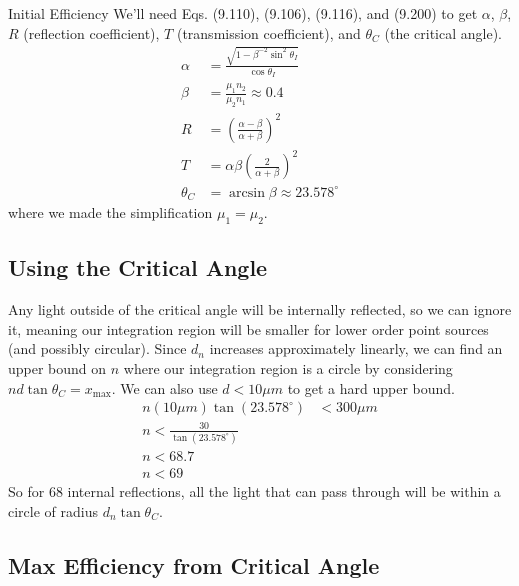 \documentclass[12pt]{article}
\newcommand{\enterProblemHeader}[1]{
	\rhead{#1}
}
\newenvironment{main_section}[1]{
	\section{#1}
	\enterProblemHeader{#1}
}{
	\pagebreak
}
\begin{document}
\begin{main_section}{Initial Efficiency}
	We'll need Eqs. (9.110), (9.106), (9.116), and (9.200) to get $\alpha$,
	$\beta$, $R$ (reflection coefficient), $T$ (transmission coefficient), and
	$\theta_C$ (the critical angle).
	\begin{align*}
		\alpha &= \frac { \sqrt{1 - \beta^{-2} \sin^2 \theta_I} } {\cos \theta_I}
		\tag{9.110}\\
		\beta &= \frac {\mu_1 n_2} {\mu_2 n_1} \approx 0.4 \tag{9.106}\\
		R &= \left( \frac { \alpha - \beta } { \alpha + \beta } \right)^2
		\tag{9.115}\\
		T &= \alpha \beta \left( \frac 2 {\alpha + \beta} \right)^2\tag{9.116}\\
		\theta_C &= \arcsin \beta \tag{9.200} \approx 23.578^\circ
	\end{align*}
	where we made the simplification $\mu_1 = \mu_2$.

	\subsection{Using the Critical Angle}

	Any light outside of the critical angle will be internally reflected, so we
	can ignore it, meaning our integration region will be smaller for lower
	order point sources (and possibly circular). Since $d_n$ increases
	approximately linearly, we can find an upper bound on $n$ where our
	integration region is a circle by considering $n d \tan \theta_C =
	x_\text{max}$. We can also use $d < 10 \si{\mu m}$ to get a hard upper
	bound.
	\begin{align*}
		n (10 \si{\mu m}) \tan(23.578^\circ) &< 300 \si{\mu m}\\
		n < \frac {30} {\tan(23.578^\circ)}\\
		n < 68.7\\
		n < 69 %
	\end{align*}
	So for 68 internal reflections, all the light that can pass through will be
	within a circle of radius $d_n \tan \theta_C$.

	\subsection{Max Efficiency from Critical Angle}


\end{main_section}
\end{document}
